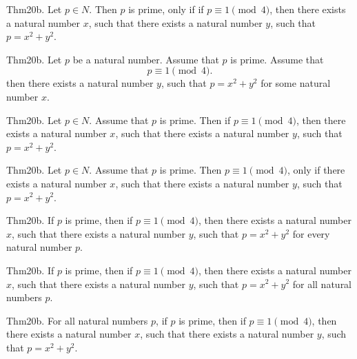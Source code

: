 \documentclass{article}
\begin{document}
Thm20b. Let $p \in N$. Then $p$ is prime, only if if $p \equiv 1 \pmod{ 4}$, then there exists a natural number $x$, such that there exists a natural number $y$, such that $p = x ^{ 2}+ y ^{ 2}$.

Thm20b. Let $p$ be a natural number. Assume that $p$ is prime. Assume that $$p \equiv 1 \pmod{ 4}.$$ then there exists a natural number $y$, such that $p = x ^{ 2}+ y ^{ 2}$ for some natural number $x$.

Thm20b. Let $p \in N$. Assume that $p$ is prime. Then if $p \equiv 1 \pmod{ 4}$, then there exists a natural number $x$, such that there exists a natural number $y$, such that $p = x ^{ 2}+ y ^{ 2}$.

Thm20b. Let $p \in N$. Assume that $p$ is prime. Then $p \equiv 1 \pmod{ 4}$, only if there exists a natural number $x$, such that there exists a natural number $y$, such that $p = x ^{ 2}+ y ^{ 2}$.

Thm20b. If $p$ is prime, then if $p \equiv 1 \pmod{ 4}$, then there exists a natural number $x$, such that there exists a natural number $y$, such that $p = x ^{ 2}+ y ^{ 2}$ for every natural number $p$.

Thm20b. If $p$ is prime, then if $p \equiv 1 \pmod{ 4}$, then there exists a natural number $x$, such that there exists a natural number $y$, such that $p = x ^{ 2}+ y ^{ 2}$ for all natural numbers $p$.

Thm20b. For all natural numbers $p$, if $p$ is prime, then if $p \equiv 1 \pmod{ 4}$, then there exists a natural number $x$, such that there exists a natural number $y$, such that $p = x ^{ 2}+ y ^{ 2}$.
\end{document}
